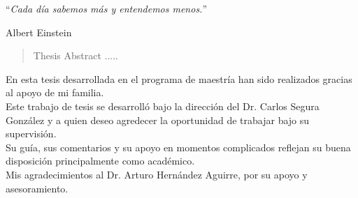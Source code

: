 \documentclass[
10pt, %
spanish, %
onehalfspacing,%
headsepline, %
]{MastersDoctoralThesis} %
\begin{document}
\cleardoublepage


\vspace*{0.2\textheight}

\noindent\enquote{\itshape Cada día sabemos más y entendemos menos.}\bigbreak

\hfill Albert Einstein


\begin{abstract}
\addchaptertocentry{\abstractname} %
Thesis Abstract .....

\end{abstract}


\begin{acknowledgements}
\addchaptertocentry{\acknowledgementname} %
En esta tesis desarrollada en el programa de maestría han sido realizados gracias al apoyo de mi familia.
\\
Este trabajo de tesis se desarrolló bajo la dirección del Dr. Carlos Segura González y a quien deseo agredecer la oportunidad de trabajar bajo su supervisión.
\\
Su guía, sus comentarios y su apoyo en momentos complicados reflejan su buena disposición principalmente como académico. 
\\
Mis agradecimientos al Dr. Arturo Hernández Aguirre, por su apoyo y asesoramiento.
\end{acknowledgements}

\end{document}
